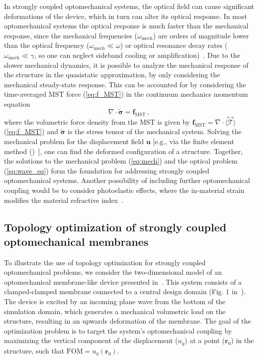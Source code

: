 In strongly coupled optomechanical systems, the optical field can cause significant deformations of the device,
 which in turn can alter its optical response. In most optomechanical systems the optical response is much faster than the mechanical response, since the 
mechanical frequencies ($\omega_\text{mech}$) are orders of magnitude lower than the optical frequency ($\omega_\text{mech}\ll\omega$) or optical resonance decay rates ($\omega_\text{mech}\ll\gamma$, so one 
can neglect sideband cooling or amplification)~\cite{opto_crys, photo_topopt, ownpub5}. Due to the slower mechanical dynamics, it is possible to analyze the mechanical response of the structure in the quasistatic approximation, by only considering the mechanical steady-state response. 
This can be accounted for by considering the time-averaged MST force (\eqref{eq:f_MST}) in the continuum mechanics momentum equation
\begin{equation}\label{eq:mech}
    \nabla \cdot \overleftrightarrow{\boldsymbol{\sigma}} = \mathbf{f}_\text{MST}  \,,
\end{equation}
where the volumetric force density from the MST is given by $ \mathbf{f}_\text{MST} = \nabla \cdot \langle \stackrel{\leftrightarrow}{\bm{\mathcal{T}}} \rangle$ (\eqref{eq:f_MST}) and $\overleftrightarrow{\boldsymbol{\sigma}}$ is the stress tensor of the mechanical system. Solving the mechanical problem for the
displacement field $\mathbf{u}$ [e.g., via the finite element method ()~\cite{cook_concepts_2001}], one can find the deformed configuration of a structure. Together, the 
solutions to the mechanical problem (\eqref{eq:mech}) and the optical problem (\eqref{eq:wave_eq}) 
form the foundation for addressing strongly coupled optomechanical systems. Another possibility of including further optomechanical coupling would be to consider
photoelastic effects, where the in-material strain modifies the material refractive index~\cite{photoelasticity}.

\subsection*{Topology optimization of strongly coupled optomechanical membranes}

To illustrate the use of topology optimization for strongly coupled optomechanical problems, we consider the two-dimensional model of an optomechanical membrane-like device presented in~\cite{ownpub5}. 
This system consists of a clamped-clamped membrane connected to a central design domain (Fig. 1 in~\cite{ownpub5}). The device is excited by an incoming plane wave from the bottom of the simulation domain, which generates a mechanical volumetric load on the structure,
resulting in an upwards deformation of the membrane. The goal of the optimization problem is to target the system's optomechanical coupling by maximizing the vertical component of the displacement ($u_y$) at a point ($\mathbf{r}_0$)
in the structure, such that $\text{FOM}=u_y(\mathbf{r}_0)$.

